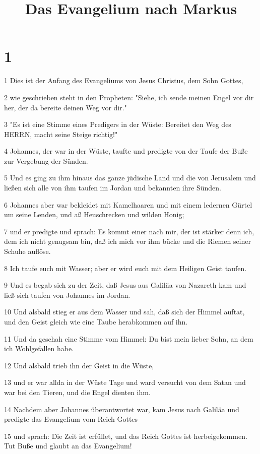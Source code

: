 

\title{Das Evangelium nach Markus}


\chapter{1}

\par 1 Dies ist der Anfang des Evangeliums von Jesus Christus, dem Sohn Gottes,
\par 2 wie geschrieben steht in den Propheten: "Siehe, ich sende meinen Engel vor dir her, der da bereite deinen Weg vor dir."
\par 3 "Es ist eine Stimme eines Predigers in der Wüste: Bereitet den Weg des HERRN, macht seine Steige richtig!"
\par 4 Johannes, der war in der Wüste, taufte und predigte von der Taufe der Buße zur Vergebung der Sünden.
\par 5 Und es ging zu ihm hinaus das ganze jüdische Land und die von Jerusalem und ließen sich alle von ihm taufen im Jordan und bekannten ihre Sünden.
\par 6 Johannes aber war bekleidet mit Kamelhaaren und mit einem ledernen Gürtel um seine Lenden, und aß Heuschrecken und wilden Honig;
\par 7 und er predigte und sprach: Es kommt einer nach mir, der ist stärker denn ich, dem ich nicht genugsam bin, daß ich mich vor ihm bücke und die Riemen seiner Schuhe auflöse.
\par 8 Ich taufe euch mit Wasser; aber er wird euch mit dem Heiligen Geist taufen.
\par 9 Und es begab sich zu der Zeit, daß Jesus aus Galiläa von Nazareth kam und ließ sich taufen von Johannes im Jordan.
\par 10 Und alsbald stieg er aus dem Wasser und sah, daß sich der Himmel auftat, und den Geist gleich wie eine Taube herabkommen auf ihn.
\par 11 Und da geschah eine Stimme vom Himmel: Du bist mein lieber Sohn, an dem ich Wohlgefallen habe.
\par 12 Und alsbald trieb ihn der Geist in die Wüste,
\par 13 und er war allda in der Wüste Tage und ward versucht von dem Satan und war bei den Tieren, und die Engel dienten ihm.
\par 14 Nachdem aber Johannes überantwortet war, kam Jesus nach Galiläa und predigte das Evangelium vom Reich Gottes
\par 15 und sprach: Die Zeit ist erfüllet, und das Reich Gottes ist herbeigekommen. Tut Buße und glaubt an das Evangelium!
